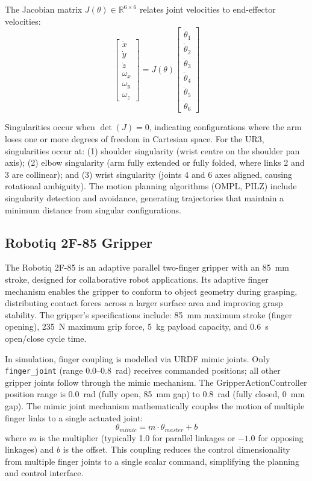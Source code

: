 \documentclass[12pt,a4paper,oneside]{report}
\begin{document}
The Jacobian matrix $J(\theta) \in \mathbb{R}^{6 \times 6}$ relates joint velocities to end-effector velocities:
\begin{equation}
\begin{bmatrix} \dot{x} \\ \dot{y} \\ \dot{z} \\ \omega_x \\ \omega_y \\ \omega_z \end{bmatrix} = J(\theta) \begin{bmatrix} \dot{\theta}_1 \\ \dot{\theta}_2 \\ \dot{\theta}_3 \\ \dot{\theta}_4 \\ \dot{\theta}_5 \\ \dot{\theta}_6 \end{bmatrix}
\end{equation}

Singularities occur when $\det(J) = 0$, indicating configurations where the arm loses one or more degrees of freedom in Cartesian space. For the UR3, singularities occur at: (1) shoulder singularity (wrist centre on the shoulder pan axis); (2) elbow singularity (arm fully extended or fully folded, where links 2 and 3 are collinear); and (3) wrist singularity (joints 4 and 6 axes aligned, causing rotational ambiguity). The motion planning algorithms (OMPL, PILZ) include singularity detection and avoidance, generating trajectories that maintain a minimum distance from singular configurations.

\subsection{Robotiq 2F-85 Gripper}

The Robotiq 2F-85 is an adaptive parallel two-finger gripper with an 85~mm stroke, designed for collaborative robot applications. Its adaptive finger mechanism enables the gripper to conform to object geometry during grasping, distributing contact forces across a larger surface area and improving grasp stability. The gripper's specifications include: 85~mm maximum stroke (finger opening), 235~N maximum grip force, 5~kg payload capacity, and 0.6~s open/close cycle time.

In simulation, finger coupling is modelled via URDF mimic joints. Only \texttt{finger\_joint} (range 0.0--0.8~rad) receives commanded positions; all other gripper joints follow through the mimic mechanism. The GripperActionController position range is 0.0~rad (fully open, 85~mm gap) to 0.8~rad (fully closed, 0~mm gap). The mimic joint mechanism mathematically couples the motion of multiple finger links to a single actuated joint:
\begin{equation}
\theta_{mimic} = m \cdot \theta_{master} + b
\end{equation}
where $m$ is the multiplier (typically 1.0 for parallel linkages or $-1.0$ for opposing linkages) and $b$ is the offset. This coupling reduces the control dimensionality from multiple finger joints to a single scalar command, simplifying the planning and control interface.
\end{document}
